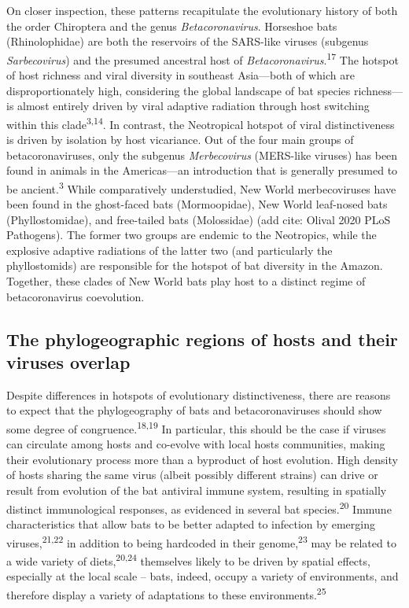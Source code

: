 \documentclass[11pt]{article}
\begin{document}
On closer inspection, these patterns recapitulate the evolutionary
history of both the order Chiroptera and the genus
\emph{Betacoronavirus}. Horseshoe bats (Rhinolophidae) are both the
reservoirs of the SARS-like viruses (subgenus \emph{Sarbecovirus}) and
the presumed ancestral host of
\emph{Betacoronavirus}.\textsuperscript{17} The hotspot of host richness
and viral diversity in southeast Asia---both of which are
disproportionately high, considering the global landscape of bat species
richness---is almost entirely driven by viral adaptive radiation through
host switching within this clade\textsuperscript{3,14}. In contrast, the
Neotropical hotspot of viral distinctiveness is driven by isolation by
host vicariance. Out of the four main groups of betacoronaviruses, only
the subgenus \emph{Merbecovirus} (MERS-like viruses) has been found in
animals in the Americas---an introduction that is generally presumed to
be ancient.\textsuperscript{3} While comparatively understudied, New
World merbecoviruses have been found in the ghost-faced bats
(Mormoopidae), New World leaf-nosed bats (Phyllostomidae), and
free-tailed bats (Molossidae) (add cite: Olival 2020 PLoS Pathogens).
The former two groups are endemic to the Neotropics, while the explosive
adaptive radiations of the latter two (and particularly the
phyllostomids) are responsible for the hotspot of bat diversity in the
Amazon. Together, these clades of New World bats play host to a distinct
regime of betacoronavirus coevolution.

\hypertarget{the-phylogeographic-regions-of-hosts-and-their-viruses-overlap}{%
\subsection{The phylogeographic regions of hosts and their viruses
overlap}\label{the-phylogeographic-regions-of-hosts-and-their-viruses-overlap}}

Despite differences in hotspots of evolutionary distinctiveness, there
are reasons to expect that the phylogeography of bats and
betacoronaviruses should show some degree of
congruence.\textsuperscript{18,19} In particular, this should be the
case if viruses can circulate among hosts and co-evolve with local hosts
communities, making their evolutionary process more than a byproduct of
host evolution. High density of hosts sharing the same virus (albeit
possibly different strains) can drive or result from evolution of the
bat antiviral immune system, resulting in spatially distinct
immunological responses, as evidenced in several bat
species.\textsuperscript{20} Immune characteristics that allow bats to
be better adapted to infection by emerging
viruses,\textsuperscript{21,22} in addition to being hardcoded in their
genome,\textsuperscript{23} may be related to a wide variety of
diets,\textsuperscript{20,24} themselves likely to be driven by spatial
effects, especially at the local scale -- bats, indeed, occupy a variety
of environments, and therefore display a variety of adaptations to these
environments.\textsuperscript{25}
\end{document}
